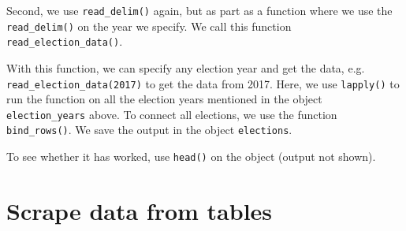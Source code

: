\documentclass[12pt,oneside]{reedthesis}
\theoremstyle{definition}
\theoremstyle{definition}
\theoremstyle{definition}
\theoremstyle{remark}
\begin{document}
  Second, we use \texttt{read\_delim()} again, but as part as a function
  where we use the \texttt{read\_delim()} on the year we specify. We call
  this function \texttt{read\_election\_data()}.
  \begin{Shaded}
  \end{Shaded}
  With this function, we can specify any election year and get the data,
  e.g. \texttt{read\_election\_data(2017)} to get the data from 2017.
  Here, we use \texttt{lapply()} to run the function on all the election
  years mentioned in the object \texttt{election\_years} above. To connect
  all elections, we use the function \texttt{bind\_rows()}. We save the
  output in the object \texttt{elections}.
  \begin{Shaded}
  \begin{Highlighting}[]
  \StringTok{ }\NormalTok{(}
  \end{Highlighting}
  \end{Shaded}
  To see whether it has worked, use \texttt{head()} on the object (output
  not shown).
  \begin{Shaded}
  \begin{Highlighting}[]
  \end{Highlighting}
  \end{Shaded}
  \section{Scrape data from tables}\label{scrape-data-from-tables}
  
\end{document}
